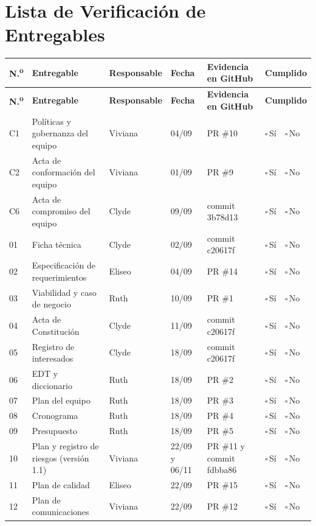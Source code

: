 \documentclass[11pt,a4paper]{article}
\newcommand{\marca}{{\Large$\square$}\,{\scriptsize Sí}\ \ {\Large$\square$}\,{\scriptsize No}}
\begin{document}
\section{Lista de Verificación de Entregables}
\newcommand{\ok}{\textcolor{Rama4}{\large$\checkmark$}}
\newcommand{\pend}{\textcolor{GrisOscuro}{\large$\square$}}
{\footnotesize
\setlength{\tabcolsep}{3pt}
\begin{longtable}{@{}C{0.8cm} >{\raggedright\arraybackslash}p{5.3cm} P{1.6cm} C{1.5cm} P{3.2cm} C{2.0cm}@{}}
\toprule
{}
\textbf{N.\textsuperscript{o}} & \textbf{Entregable} & \textbf{Responsable} & \textbf{Fecha} & \textbf{Evidencia en GitHub} & \textbf{Cumplido} \\
\midrule
\endfirsthead
\toprule
{}
\textbf{N.\textsuperscript{o}} & \textbf{Entregable} & \textbf{Responsable} & \textbf{Fecha} & \textbf{Evidencia en GitHub} & \textbf{Cumplido} \\
\midrule
\endhead
C1 & Políticas y gobernanza del equipo & Viviana & 04/09 & PR \#10 & \marca \\
C2 & Acta de conformación del equipo & Viviana & 01/09 & PR \#9 & \marca \\
C6 & Acta de compromiso del equipo & Clyde & 09/09 & commit 3b78d13 & \marca \\
01 & Ficha técnica & Clyde & 02/09 & commit c20617f & \marca \\
02 & Especificación de requerimientos & Eliseo & 04/09 & PR \#14 & \marca \\
03 & Viabilidad y caso de negocio & Ruth & 10/09 & PR \#1 & \marca \\
04 & Acta de Constitución & Clyde & 11/09 & commit c20617f & \marca \\
05 & Registro de interesados & Clyde & 18/09 & commit c20617f & \marca \\
06 & EDT y diccionario & Ruth & 18/09 & PR \#2 & \marca \\
07 & Plan del equipo & Ruth & 18/09 & PR \#3 & \marca \\
08 & Cronograma & Ruth & 18/09 & PR \#4 & \marca \\
09 & Presupuesto & Ruth & 18/09 & PR \#5 & \marca \\
10 & Plan y registro de riesgos (versión 1.1) & Viviana & 22/09 y 06/11 & PR \#11 y commit fdbba86 & \marca \\
11 & Plan de calidad & Eliseo & 22/09 & PR \#15 & \marca \\
12 & Plan de comunicaciones & Viviana & 22/09 & PR \#12 & \marca \\

\end{longtable}}
\end{document}
